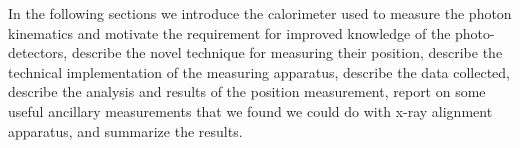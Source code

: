 In the following sections we introduce the calorimeter used to measure the photon kinematics and motivate the requirement for improved knowledge of the photo-detectors, describe the novel technique for measuring their position, describe the technical implementation of the measuring apparatus, describe the data collected, describe the analysis and results of the position measurement, report on some useful ancillary measurements that we found we could do with x-ray alignment apparatus, and summarize the results.  